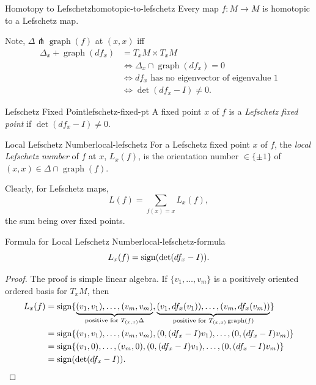 \begin{proposition}{Homotopy to Lefschetz}{homotopic-to-lefschetz}
    Every map $f \colon M \to M$ is homotopic to a Lefschetz map.
\end{proposition}

Note, $\Delta \pitchfork \operatorname{graph}(f)$ at $(x, x)$ iff
\begin{align*}
    \Delta_x + \operatorname{graph}(df_x) &= T_x M \times T_x M \\
    &\iff \Delta_x \cap \operatorname{graph}(df_x) = 0 \\
    &\iff df_x \text{ has no eigenvector of eigenvalue } 1 \\
    &\iff \det(df_x - I) \neq 0.
\end{align*}

\begin{definition}{Lefschetz Fixed Point}{lefschetz-fixed-pt}
    A fixed point $x$ of $f$ is a \emph{Lefschetz fixed point} if $\det(df_x - I) \neq 0$.
\end{definition}

\begin{definition}{Local Lefschetz Number}{local-lefschetz}
    For a Lefschetz fixed point $x$ of $f$, the \emph{local Lefschetz number} of $f$ at $x$, $L_x(f)$, is the orientation number $\in \{\pm 1\}$ of $(x, x) \in \Delta \cap \operatorname{graph}(f)$.
\end{definition}

Clearly, for Lefschetz maps,
\[
    L(f) = \sum_{f(x) = x} L_x(f),
\]
the sum being over fixed points.

\begin{proposition}{Formula for Local Lefschetz Number}{local-lefschetz-formula}
    \[
        L_x(f) = \operatorname{sign}(\det(df_x - I)).
    \]
\end{proposition}

\begin{proof}
    The proof is simple linear algebra. If $\{v_1, \ldots, v_m\}$ is a positively oriented ordered basis for $T_x M$, then
    \begin{align*}
        L_x(f) &= \operatorname{sign}\{\underbrace{(v_1, v_1), \ldots, (v_m, v_m)}_{\text{positive for } T_{(x,x)}\Delta}, \underbrace{(v_1, df_x(v_1)), \ldots, (v_m, df_x(v_m))}_{\text{positive for } T_{(x,x)} \operatorname{graph}(f)}\} \\
        &= \operatorname{sign}\{(v_1, v_1), \ldots, (v_m, v_m), (0, (df_x - I)v_1), \ldots, (0, (df_x - I)v_m)\} \\
        &= \operatorname{sign}\{(v_1, 0), \ldots, (v_m, 0), (0, (df_x - I)v_1), \ldots, (0, (df_x - I)v_m)\} \\
        &= \operatorname{sign}(\det(df_x - I)).
    \end{align*}
\end{proof}

